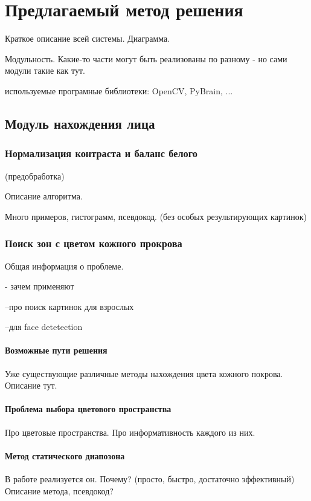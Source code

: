 \documentclass[12pt]{report}
\begin{document}
\chapter{Предлагаемый метод решения}
\thispagestyle{fancy}

Краткое описание всей системы. Диаграмма.

Модульность. Какие-то части могут быть реализованы по разному - но сами модули такие как тут.

используемые програмные библиотеки: OpenCV, PyBrain, ...

\section{Модуль нахождения лица}

\subsection{Нормализация контраста и баланс белого}
(предобработка)

Описание алгоритма.

Много примеров, гистограмм, псевдокод. (без особых результирующих картинок)

\subsection{Поиск зон с цветом кожного прокрова}
Общая информация о проблеме.

- зачем применяют 

	--про поиск картинок для взрослых
	
	--для face detetection
\subsubsection{Возможные пути решения}
Уже существующие различные методы нахождения цвета кожного покрова. Описание тут.
\subsubsection{Проблема выбора цветового пространства}
Про цветовые пространства. Про информативность каждого из них.
\subsubsection{Метод статического диапозона}
В работе реализуется он. Почему? (просто, быстро, достаточно эффективный)
Описание метода, псевдокод?
\end{document}
